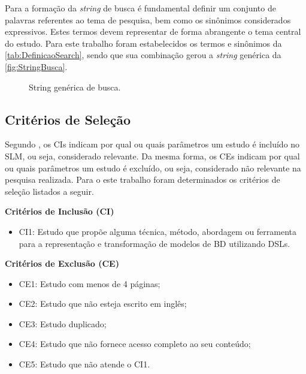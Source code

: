 Para a formação da \textit{string} de busca é fundamental definir um conjunto de palavras referentes ao tema de pesquisa, bem como os sinônimos considerados expressivos. 
Estes termos devem representar de forma abrangente o tema central do estudo. 
Para este trabalho foram estabelecidos os termos e sinônimos da \autoref{tab:DefinicaoSearch}, sendo que sua combinação gerou a \textit{string} genérica da \autoref{fig:StringBusca}.
        
\begin{figure}[htb]
    \caption{String genérica de busca.}
    \centering
    \small
    \label{fig:StringBusca}
\end{figure}
        
    \subsection{Critérios de Seleção} \label{ssec:CritSelecao}
    
Segundo , os \acp{CI} indicam por qual ou quais parâmetros um estudo é incluído no \ac{SLM}, ou seja, considerado relevante. 
Da mesma forma, os \acp{CE} indicam por qual ou quais parâmetros um estudo é excluído, ou seja, considerado não relevante na pesquisa realizada. 
Para o este trabalho foram determinados os critérios de seleção listados a seguir.

\textbf{Critérios de Inclusão (\ac{CI})}
\begin{itemize}
    \item CI1: Estudo que propõe alguma técnica, método, abordagem ou ferramenta para a representação e transformação de modelos de \ac{BD} utilizando \acp{DSL}.
\end{itemize}

\textbf{Critérios de Exclusão (\ac{CE})}
\begin{itemize}
    \item CE1: Estudo com menos de 4 páginas;  
    \item CE2: Estudo que não esteja escrito em inglês;
    \item CE3: Estudo duplicado;
    \item CE4: Estudo que não fornece acesso completo ao seu conteúdo;
    \item CE5: Estudo que não atende o CI1.
\end{itemize}
    
